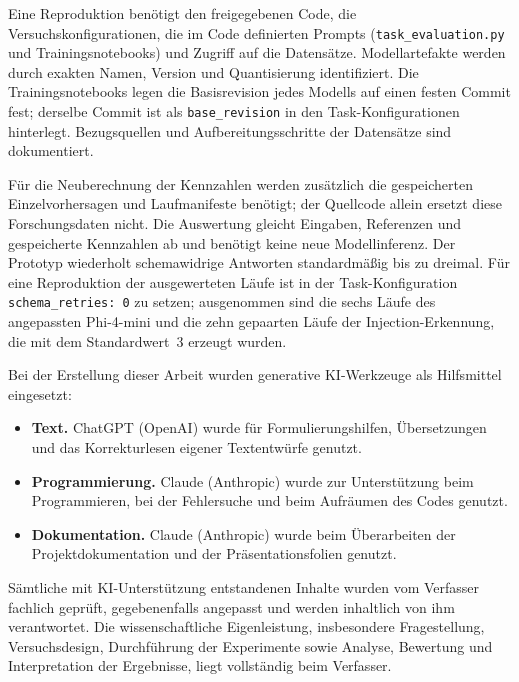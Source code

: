 \documentclass[12pt,twoside=false,a4paper,parskip]{scrbook}
\begin{document}
Eine Reproduktion benötigt den freigegebenen Code, die Versuchskonfigurationen, die im Code definierten Prompts (\texttt{task\_evaluation.py} und Trainingsnotebooks) und Zugriff auf die Datensätze. Modellartefakte werden durch exakten Namen, Version und Quantisierung identifiziert. Die Trainingsnotebooks legen die Basisrevision jedes Modells auf einen festen Commit fest; derselbe Commit ist als \texttt{base\_revision} in den Task-Konfigurationen hinterlegt. Bezugsquellen und Aufbereitungsschritte der Datensätze sind dokumentiert.

Für die Neuberechnung der Kennzahlen werden zusätzlich die gespeicherten Einzelvorhersagen und Laufmanifeste benötigt; der Quellcode allein ersetzt diese Forschungsdaten nicht. Die Auswertung gleicht Eingaben, Referenzen und gespeicherte Kennzahlen ab und benötigt keine neue Modellinferenz. Der Prototyp wiederholt schemawidrige Antworten standardmäßig bis zu dreimal. Für eine Reproduktion der ausgewerteten Läufe ist in der Task-Konfiguration \texttt{schema\_retries: 0} zu setzen; ausgenommen sind die sechs Läufe des angepassten Phi-4-mini und die zehn gepaarten Läufe der Injection-Erkennung, die mit dem Standardwert~3 erzeugt wurden.

\backmatter

\cleardoublepage
{}
{}
\printbibliography[title={Literaturverzeichnis}]


Bei der Erstellung dieser Arbeit wurden generative KI-Werkzeuge als Hilfsmittel eingesetzt:

\begin{itemize}
  \item \textbf{Text.} ChatGPT (OpenAI) wurde für Formulierungshilfen, Übersetzungen und das Korrekturlesen eigener Textentwürfe genutzt.
  \item \textbf{Programmierung.} Claude (Anthropic) wurde zur Unterstützung beim Programmieren, bei der Fehlersuche und beim Aufräumen des Codes genutzt.
  \item \textbf{Dokumentation.} Claude (Anthropic) wurde beim Überarbeiten der Projektdokumentation und der Präsentationsfolien genutzt.
\end{itemize}

Sämtliche mit KI-Unterstützung entstandenen Inhalte wurden vom Verfasser fachlich geprüft, gegebenenfalls angepasst und werden inhaltlich von ihm verantwortet. Die wissenschaftliche Eigenleistung, insbesondere Fragestellung, Versuchsdesign, Durchführung der Experimente sowie Analyse, Bewertung und Interpretation der Ergebnisse, liegt vollständig beim Verfasser.
\end{document}
